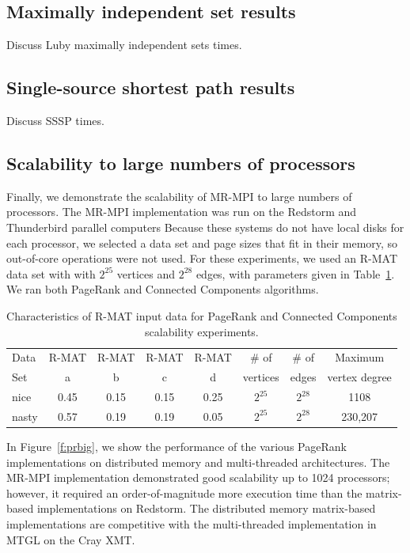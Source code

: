 \subsection{Maximally independent set results}
Discuss Luby maximally independent sets times.

\subsection{Single-source shortest path results}
Discuss SSSP times.

\subsection{Scalability to large numbers of processors}
Finally, we demonstrate the scalability of MR-MPI to large numbers of 
processors.  
The MR-MPI implementation was run on the Redstorm and Thunderbird
parallel computers
Because these systems do not have local disks for each processor, we selected 
a data set and page sizes that fit in their memory, so out-of-core operations
were not used.  For these experiments, we used an R-MAT data set with 
with $2^{25}$ vertices and $2^{28}$ edges, with parameters given in
Table~\ref{t:rmat}.  We ran both PageRank and Connected Components
algorithms.

\begin{table}
\begin{tabular}{|l|c|c|c|c|c|c|c|}
\hline
Data & R-MAT  & R-MAT  & R-MAT  & R-MAT  & \# of    & \# of & Maximum \\
Set  & a      & b      & c      & d      & vertices & edges & vertex degree\\
\hline
nice  & 0.45 & 0.15 & 0.15 & 0.25 & $2^{25}$ & $2^{28}$ & 1108 \\
nasty & 0.57 & 0.19 & 0.19 & 0.05 & $2^{25}$ & $2^{28}$ & 230,207\\
\hline
\end{tabular}
\caption{Characteristics of R-MAT input data for PageRank and Connected
Components scalability experiments.}
\label{t:rmat}
\end{table}

In Figure~\ref{f:prbig}, we show the performance 
of the various PageRank
implementations on distributed memory and multi-threaded architectures.
The MR-MPI implementation demonstrated good scalability up to 1024 processors; 
however, it required an order-of-magnitude
more execution time than the matrix-based implementations on Redstorm.  
The distributed memory matrix-based
implementations are competitive with the multi-threaded implementation
in MTGL on the Cray XMT.

